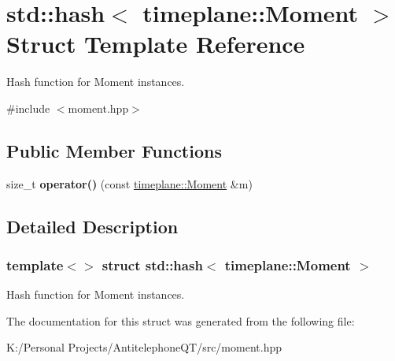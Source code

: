 \hypertarget{structstd_1_1hash_3_01timeplane_1_1_moment_01_4}{}\section{std\+:\+:hash$<$ timeplane\+:\+:Moment $>$ Struct Template Reference}
\label{structstd_1_1hash_3_01timeplane_1_1_moment_01_4}


Hash function for {\ttfamily Moment} instances.  




{\ttfamily \#include $<$moment.\+hpp$>$}

\subsection*{Public Member Functions}
\begin{DoxyCompactItemize}
\item 
\mbox{\label{structstd_1_1hash_3_01timeplane_1_1_moment_01_4_a29ac692bfada0bbd1a2c47ae433942f7}} 
size\+\_\+t {\bfseries operator()} (const \hyperlink{classtimeplane_1_1_moment}{timeplane\+::\+Moment} \&m)
\end{DoxyCompactItemize}


\subsection{Detailed Description}
\subsubsection*{template$<$$>$\newline
struct std\+::hash$<$ timeplane\+::\+Moment $>$}

Hash function for {\ttfamily Moment} instances. 

The documentation for this struct was generated from the following file\+:\begin{DoxyCompactItemize}
\item 
K\+:/\+Personal Projects/\+Antitelephone\+Q\+T/src/moment.\+hpp\end{DoxyCompactItemize}
